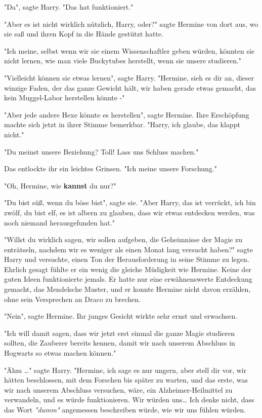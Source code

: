 {"Da", sagte Harry. "Das hat funktioniert."

"Aber es ist nicht wirklich nützlich, Harry, oder?" sagte Hermine von dort aus, wo sie saß und ihren Kopf in die Hände gestützt hatte.

"Ich meine, selbst wenn wir sie einem Wissenschaftler geben würden, könnten sie nicht lernen, wie man viele Buckytubes herstellt, wenn sie unsere studieren."

"Vielleicht können sie etwas lernen", sagte Harry. "Hermine, sieh es dir an, dieser winzige Faden, der das ganze Gewicht hält, wir haben gerade etwas gemacht, das kein Muggel-Labor herstellen könnte -"

"Aber jede andere Hexe könnte es herstellen", sagte Hermine. Ihre Erschöpfung machte sich jetzt in ihrer Stimme bemerkbar. "Harry, ich glaube, das klappt nicht."

"Du meinst unsere Beziehung? Toll! Lass uns Schluss machen."

Das entlockte ihr ein leichtes Grinsen. "Ich meine unsere Forschung."

"Oh, Hermine, wie \textbf{kannst} du nur?"

"Du bist süß, wenn du böse bist", sagte sie. "Aber Harry, das ist verrückt, ich bin zwölf, du bist elf, es ist albern zu glauben, dass wir etwas entdecken werden, was noch niemand herausgefunden hat."

"Willst du wirklich sagen, wir sollen aufgeben, die Geheimnisse der Magie zu enträtseln, nachdem wir es weniger als einen Monat lang versucht haben?" sagte Harry und versuchte, einen Ton der Herausforderung in seine Stimme zu legen. Ehrlich gesagt fühlte er ein wenig die gleiche Müdigkeit wie Hermine. Keine der guten Ideen funktionierte jemals. Er hatte nur eine erwähnenswerte Entdeckung gemacht, das Mendelsche Muster, und er konnte Hermine nicht davon erzählen, ohne sein Versprechen an Draco zu brechen.

"Nein", sagte Hermine. Ihr junges Gesicht wirkte sehr ernst und erwachsen.

"Ich will damit sagen, dass wir jetzt erst einmal die ganze Magie studieren sollten, die Zauberer bereits kennen, damit wir nach unserem Abschluss in Hogwarts so etwas machen können."

"Ähm …" sagte Harry. "Hermine, ich sage es nur ungern, aber stell dir vor, wir hätten beschlossen, mit dem Forschen bis später zu warten, und das erste, was wir nach unserem Abschluss versuchen, wäre, ein Alzheimer-Heilmittel zu verwandeln, und es würde funktionieren. Wir würden uns… Ich denke nicht, dass das Wort \emph{"dumm"} angemessen beschreiben würde, wie wir uns fühlen würden.

}
